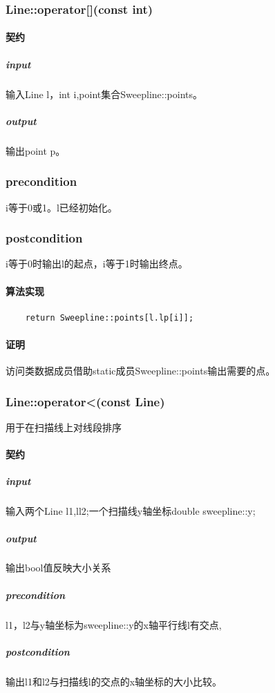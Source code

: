 \documentclass[a4paper]{book}
\numberwithin{equation}{chapter}
\theoremstyle{definition}
\begin{document}
\subsubsection{Line::operator[](const int)}
\paragraph{契约}
\subparagraph{input}
输入Line l，int i,point集合Sweepline::points。
\subparagraph{output}
输出point p。
\subsubsection{precondition}
i等于0或1。l已经初始化。
\subsubsection{postcondition}
i等于0时输出l的起点，i等于1时输出终点。
\paragraph{算法实现}
\begin{lstlisting}
	return Sweepline::points[l.lp[i]];
\end{lstlisting}
\paragraph{证明}
访问类数据成员借助static成员Sweepline::points输出需要的点。

\subsubsection{Line::operator<(const Line)}
用于在扫描线上对线段排序
\paragraph{契约}
\subparagraph{input}
输入两个Line l1,ll2;一个扫描线y轴坐标double sweepline::y;
\subparagraph{output}
输出bool值反映大小关系
\subparagraph{precondition}
l1，l2与y轴坐标为sweepline::y的x轴平行线l有交点,
\subparagraph{postcondition}
输出l1和l2与扫描线l的交点的x轴坐标的大小比较。
\end{document}
